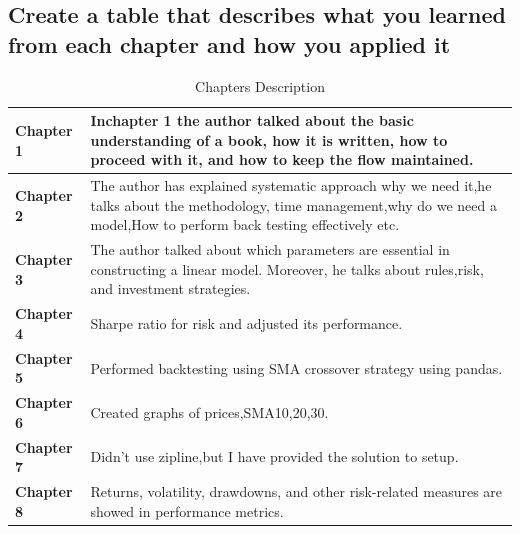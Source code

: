 \documentclass[12pt,a4paper]{article}
\begin{document}
\subsection{Create a table that describes what you learned from each chapter and how you applied it}
\begin{table}[h!]
    \centering
    \caption{Chapters Description }
    \begin{tabular}{|l|p{9cm}|}
        \hline
      \textbf{Chapter 1}&Inchapter 1 the author talked about the basic understanding of a book, how it is written, how to proceed with it, and how to keep the flow maintained.\ \\ %
       \hline %
       \textbf{Chapter 2}&The author has explained systematic approach why we need it,he talks about the methodology, time management,why do we need a model,How to perform back testing effectively etc. \\ %
       \hline %
      \textbf{Chapter 3}&The author talked about which parameters are essential in constructing a linear model. Moreover, he talks about rules,risk, and investment strategies. \\ %
       \hline %
       \textbf{Chapter 4}&Sharpe ratio for risk and adjusted its performance. \\ %
       \hline %
       \textbf{Chapter 5}&Performed backtesting using SMA crossover strategy using pandas.\\ %
       \hline %
       \textbf{Chapter 6}&Created graphs of prices,SMA10,20,30. \\ %
       \hline %
       \textbf{Chapter 7}&Didn't use zipline,but I have provided the solution to setup. \\ %
       \hline %
       \textbf{Chapter 8}&Returns, volatility, drawdowns, and other risk-related measures are showed in performance metrics. \\ %
       \hline %
    \end{tabular}
\end{table}

    

    
\end{document}
